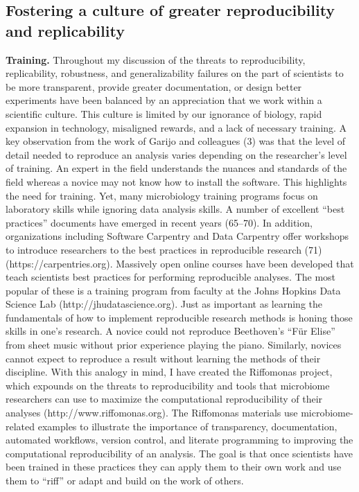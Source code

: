 \documentclass[]{article}
\begin{document}
\subsection{Fostering a culture of greater reproducibility and
replicability}\label{fostering-a-culture-of-greater-reproducibility-and-replicability}

\textbf{Training.} Throughout my discussion of the threats to
reproducibility, replicability, robustness, and generalizability
failures on the part of scientists to be more transparent, provide
greater documentation, or design better experiments have been balanced
by an appreciation that we work within a scientific culture. This
culture is limited by our ignorance of biology, rapid expansion in
technology, misaligned rewards, and a lack of necessary training. A key
observation from the work of Garijo and colleagues (3) was that the
level of detail needed to reproduce an analysis varies depending on the
researcher's level of training. An expert in the field understands the
nuances and standards of the field whereas a novice may not know how to
install the software. This highlights the need for training. Yet, many
microbiology training programs focus on laboratory skills while ignoring
data analysis skills. A number of excellent ``best practices'' documents
have emerged in recent years (65--70). In addition, organizations
including Software Carpentry and Data Carpentry offer workshops to
introduce researchers to the best practices in reproducible research
(71) (https://carpentries.org). Massively open online courses have been
developed that teach scientists best practices for performing
reproducible analyses. The most popular of these is a training program
from faculty at the Johns Hopkins Data Science Lab
(http://jhudatascience.org). Just as important as learning the
fundamentals of how to implement reproducible research methods is honing
those skills in one's research. A novice could not reproduce Beethoven's
``Für Elise'' from sheet music without prior experience playing the
piano. Similarly, novices cannot expect to reproduce a result without
learning the methods of their discipline. With this analogy in mind, I
have created the Riffomonas project, which expounds on the threats to
reproducibility and tools that microbiome researchers can use to
maximize the computational reproducibility of their analyses
(http://www.riffomonas.org). The Riffomonas materials use
microbiome-related examples to illustrate the importance of
transparency, documentation, automated workflows, version control, and
literate programming to improving the computational reproducibility of
an analysis. The goal is that once scientists have been trained in these
practices they can apply them to their own work and use them to ``riff''
or adapt and build on the work of others.
\end{document}
